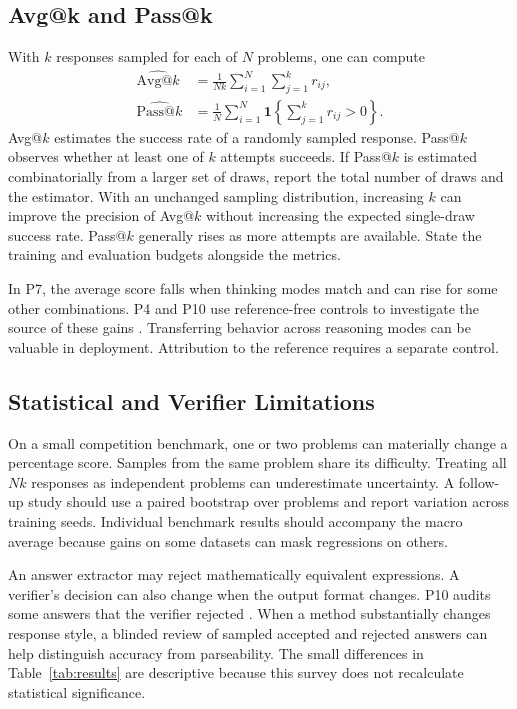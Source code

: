 \documentclass[11pt,a4paper]{article}
\begin{document}
\subsection{Avg@k and Pass@k}
With \(k\) responses sampled for each of \(N\) problems, one can compute
\begin{equation}
\begin{aligned}
\widehat{\mathrm{Avg@}k}&=\frac{1}{Nk}\sum_{i=1}^{N}\sum_{j=1}^{k}r_{ij},\\
\widehat{\mathrm{Pass@}k}&=\frac{1}{N}\sum_{i=1}^{N}
\mathbf 1\left\{\sum_{j=1}^{k}r_{ij}>0\right\}.
\end{aligned}
\end{equation}
Avg@\(k\) estimates the success rate of a randomly sampled response. Pass@\(k\) observes whether at least one of \(k\) attempts succeeds. If Pass@\(k\) is estimated combinatorially from a larger set of draws, report the total number of draws and the estimator. With an unchanged sampling distribution, increasing \(k\) can improve the precision of Avg@\(k\) without increasing the expected single-draw success rate. Pass@\(k\) generally rises as more attempts are available. State the training and evaluation budgets alongside the metrics.

In P7, the average score falls when thinking modes match and can rise for some other combinations. P4 and P10 use reference-free controls to investigate the source of these gains \cite{p4,p7,p10}. Transferring behavior across reasoning modes can be valuable in deployment. Attribution to the reference requires a separate control.

\subsection{Statistical and Verifier Limitations}
On a small competition benchmark, one or two problems can materially change a percentage score. Samples from the same problem share its difficulty. Treating all \(Nk\) responses as independent problems can underestimate uncertainty. A follow-up study should use a paired bootstrap over problems and report variation across training seeds. Individual benchmark results should accompany the macro average because gains on some datasets can mask regressions on others.

An answer extractor may reject mathematically equivalent expressions. A verifier's decision can also change when the output format changes. P10 audits some answers that the verifier rejected \cite{p10}. When a method substantially changes response style, a blinded review of sampled accepted and rejected answers can help distinguish accuracy from parseability. The small differences in Table~\ref{tab:results} are descriptive because this survey does not recalculate statistical significance.
\end{document}
